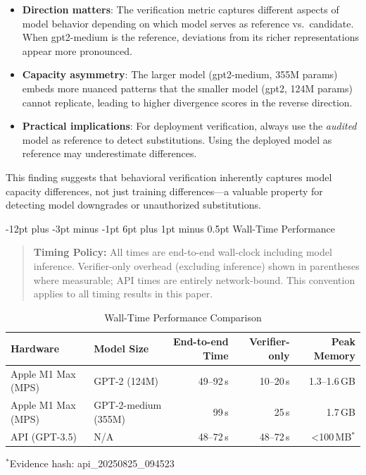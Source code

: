 \documentclass[11pt]{article}
\makeatletter
\renewcommand\subsection{\@startsection{subsection}{2}{\z@}%
  {-12pt plus -3pt minus -1pt}%
  {6pt plus 1pt minus 0.5pt}%
  {\normalfont\large\bfseries}}
\makeatother
\begin{document}
\begin{itemize}
\item \textbf{Direction matters}: The verification metric captures different aspects of model behavior depending on which model serves as reference vs.\ candidate. When gpt2-medium is the reference, deviations from its richer representations appear more pronounced.
\item \textbf{Capacity asymmetry}: The larger model (gpt2-medium, 355M params) embeds more nuanced patterns that the smaller model (gpt2, 124M params) cannot replicate, leading to higher divergence scores in the reverse direction.
\item \textbf{Practical implications}: For deployment verification, always use the \emph{audited} model as reference to detect substitutions. Using the deployed model as reference may underestimate differences.
\end{itemize}

This finding suggests that behavioral verification inherently captures model capacity differences, not just training differences---a valuable property for detecting model downgrades or unauthorized substitutions.

\subsection{Wall-Time Performance}

\begin{quote}
{\footnotesize
\textbf{Timing Policy:} All times are end-to-end wall-clock including model inference. Verifier-only overhead (excluding inference) shown in parentheses where measurable; API times are entirely network-bound. This convention applies to all timing results in this paper.}
\end{quote}

\begin{table}[ht!]
\centering
\caption{Wall-Time Performance Comparison}
\label{tab:wall-time}
\small
\begin{tabular}{l l r r r}
\toprule
\textbf{Hardware} & \textbf{Model Size} & \textbf{End-to-end Time} & \textbf{Verifier-only} & \textbf{Peak Memory} \\
\midrule
Apple M1 Max (MPS) & GPT-2 (124M) & 49--92\,s & 10--20\,s & 1.3--1.6\,GB \\
Apple M1 Max (MPS) & GPT-2-medium (355M) & 99\,s & 25\,s & 1.7\,GB \\
API (GPT-3.5) & N/A & 48--72\,s & 48--72\,s & <100\,MB$^*$ \\
\bottomrule
\end{tabular}

\vspace{3pt}
\footnotesize{$^*$Evidence hash: api\_20250825\_094523}
\end{table}
\end{document}
